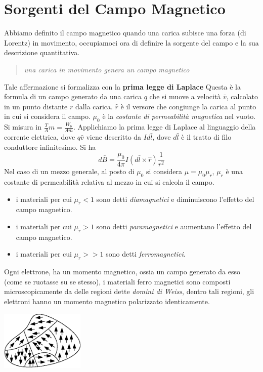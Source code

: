 \documentclass[10pt, letterpaper]{report}
\begin{document}
\section{Sorgenti del Campo Magnetico}
Abbiamo definito il campo magnetico quando una carica subisce una forza (di Lorentz) in movimento, occupiamoci ora di definire la sorgente del campo e la sua descrizione quantitativa. \begin{quote}
    \textit{una carica in movimento genera un campo magnetico}
\end{quote}
Tale affermazione si formalizza con la \textbf{prima legge di Laplace} 
Questa è la formula di un campo generato da una carica $q$ che si muove a velocità $\bar v$, calcolato in un punto distante $r$ dalla carica. $\hat r$ è il versore che congiunge la carica al punto in cui si considera il campo.\acc 
$\mu_0$ è la \textit{costante di permeabilità magnetica} nel vuoto. Si misura in $\frac{T}{A}m=\frac{W_b}{Am}$.\acc 
Applichiamo la prima legge di Laplace al linguaggio della corrente elettrica, dove $q\bar v$ viene descritto da $I d\bar l$, dove $d\bar l$ è il tratto di filo conduttore infinitesimo. Si ha 
$$ d\bar B=\frac{\mu_0}{4\pi}I(d\bar l \times \hat r)\frac{1}{r^2}$$
Nel caso di un mezzo generale, al posto di $\mu_0$ si considera $\mu=\mu_0\mu_r$, $\mu_r$ è una costante di permeabilità relativa al mezzo in cui si calcola il campo.\begin{itemize}
    \item i materiali per cui $\mu_r<1$ sono detti \textit{diamagnetici} e diminuiscono l'effetto del campo magnetico.
    \item i materiali per cui $\mu_r>1$ sono detti \textit{paramagnetici} e aumentano l'effetto del campo magnetico.
    \item i materiali per cui $\mu_r>>1$ sono detti \textit{ferromagnetici}. 
\end{itemize}
Ogni elettrone, ha un momento magnetico, ossia un campo generato da esso (come se ruotasse su se stesso),
i materiali ferro magnetici sono composti microscopicamente da delle regioni dette \textit{domini di Weiss}, dentro tali regioni, gli elettroni hanno un momento magnetico polarizzato identicamente.
\begin{center}
    \includegraphics[width=0.3\textwidth ]{images/ferromagneti2.eps}
\end{center}
\end{document}
